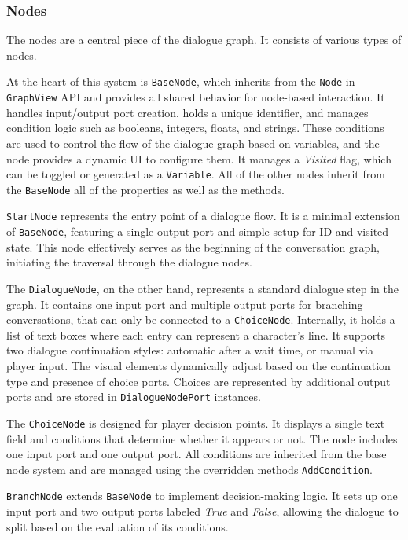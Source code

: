 \subsubsection{Nodes}
The nodes are a central piece of the dialogue graph. It consists of various types of nodes.

At the heart of this system is \verb|BaseNode|, which inherits from the \verb|Node| in \verb|GraphView| API and provides all shared behavior for node-based interaction. It handles input/output port creation, holds a unique identifier, and manages condition logic such as booleans, integers, floats, and strings. These conditions are used to control the flow of the dialogue graph based on variables, and the node provides a dynamic UI to configure them. It manages a \textit{Visited} flag, which can be toggled or generated as a \verb|Variable|. All of the other nodes inherit from the \verb|BaseNode| all of the properties as well as the methods.

\verb|StartNode| represents the entry point of a dialogue flow. It is a minimal extension of \verb|BaseNode|, featuring a single output port and simple setup for ID and visited state. This node effectively serves as the beginning of the conversation graph, initiating the traversal through the dialogue nodes.

 The \verb|DialogueNode|, on the other hand, represents a standard dialogue step in the graph. It contains one input port and multiple output ports for branching conversations, that can only be connected to a \verb|ChoiceNode|. Internally, it holds a list of text boxes where each entry can represent a character's line. It supports two dialogue continuation styles: automatic after a wait time, or manual via player input. The visual elements dynamically adjust based on the continuation type and presence of choice ports. Choices are represented by additional output ports and are stored in \verb|DialogueNodePort| instances.

 The \verb|ChoiceNode| is designed for player decision points. It displays a single text field and conditions that determine whether it appears or not. The node includes one input port and one output port. All conditions are inherited from the base node system and are managed using the overridden methods \verb|AddCondition|.

\verb|BranchNode| extends \verb|BaseNode| to implement decision-making logic. It sets up one input port and two output ports labeled \textit{True} and \textit{False}, allowing the dialogue to split based on the evaluation of its conditions. 

